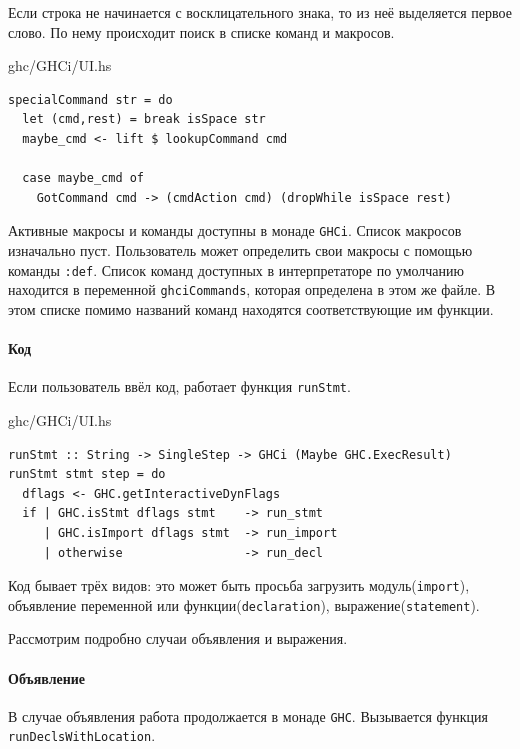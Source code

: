 \documentclass[fontsize=14pt, paper=a4, pagesize, DIV=calc]{scrartcl}
\def\code#1{\texttt{#1}}
\begin{document}
Если строка не начинается с восклицательного знака, то из неё выделяется первое
слово. По нему происходит поиск в списке команд и макросов. 

\begin{ListingEnv}
\caption{ghc/GHCi/UI.hs}
\begin{lstlisting}[firstnumber=1206]
specialCommand str = do
  let (cmd,rest) = break isSpace str
  maybe_cmd <- lift $ lookupCommand cmd

  case maybe_cmd of
    GotCommand cmd -> (cmdAction cmd) (dropWhile isSpace rest)
\end{lstlisting}
\end{ListingEnv}

Активные макросы и команды доступны в монаде \code{GHCi}. Список макросов
изначально пуст. Пользователь может определить свои макросы с помощью команды
\code{:def}. Список команд доступных в интерпретаторе по умолчанию находится в
переменной \code{ghciCommands}, которая определена в этом же файле. В этом
списке помимо названий команд находятся соответствующие им функции.

\paragraph{Код}

Если пользователь ввёл код, работает функция \code{runStmt}.

\begin{ListingEnv}
\caption{ghc/GHCi/UI.hs}
\begin{lstlisting}[firstnumber=1080]
runStmt :: String -> SingleStep -> GHCi (Maybe GHC.ExecResult)
runStmt stmt step = do
  dflags <- GHC.getInteractiveDynFlags
  if | GHC.isStmt dflags stmt    -> run_stmt
     | GHC.isImport dflags stmt  -> run_import
     | otherwise                 -> run_decl
\end{lstlisting}
\end{ListingEnv}

Код бывает трёх видов: это может быть просьба загрузить модуль(\code{import}),
объявление переменной или функции(\code{declaration}),
выражение(\code{statement}).

Рассмотрим подробно случаи объявления и выражения.

\paragraph{Объявление}

В случае объявления работа продолжается в монаде \code{GHC}. Вызывается функция
\code{runDeclsWithLocation}.
\end{document}
